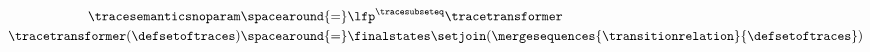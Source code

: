 \begin{align*}
  \tracesemanticsnoparam &\spacearound{=} \lfp^{\tracesubseteq} \tracetransformer \\
  \tracetransformer(\defsetoftraces) &\spacearound{=} \finalstates \setjoin (\mergesequences{\transitionrelation}{\defsetoftraces})
\end{align*}
